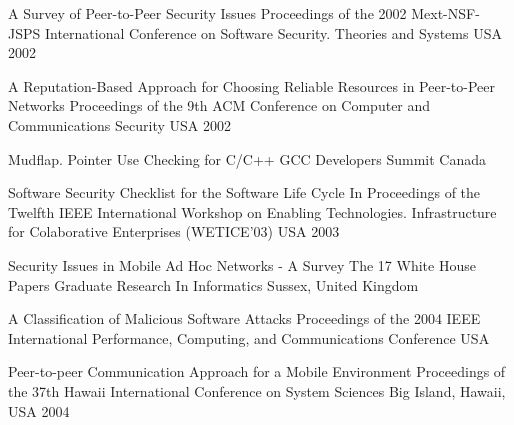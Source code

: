 \begin{thebibliography}{9}
		{}
		{A Survey of Peer-to-Peer Security Issues}
		{Proceedings of the 2002 {M}ext-{NSF}-{JSPS} International Conference on Software Security. Theories and Systems}
		{USA}
		{2002}
	
		{
			\BibAnd
			\BibAnd
			\BibAnd
			\BibAnd
			}
		{A Reputation-Based Approach for Choosing Reliable Resources in Peer-to-Peer Networks}
		{Proceedings of the 9th ACM Conference on Computer and Communications Security}
		{USA}
		{2002}
		
		{}
		{Mudflap. Pointer Use Checking for {C/C++}}
		{{GCC} Developers Summit}
		{Canada}
		{}
	
		{
			\BibAnd
			\BibAnd
			}
		{Software Security Checklist for the Software Life Cycle}
		{In Proceedings of the Twelfth {IEEE} International Workshop on Enabling Technologies. Infrastructure for Colaborative Enterprises ({WETICE}'03)}
		{USA}
		{2003}
	
		{
			\BibAnd
			}
		{Security Issues in Mobile Ad Hoc Networks - A Survey}
		{The 17 White House Papers Graduate Research In Informatics}
		{Sussex, United Kingdom}
		{}
	
		{
			\BibAnd
			}
		{A Classification of Malicious Software Attacks}
		{Proceedings of the 2004 IEEE International Performance, Computing, and Communications Conference}
		{USA}
		{}
	
		{
			\BibAnd
			\BibAnd
			}
		{Peer-to-peer Communication Approach for a Mobile Environment}
		{Proceedings of the 37th {H}awaii International Conference on System Sciences}
		{Big Island, Hawaii, USA}
		{2004}
	

\end{thebibliography}
